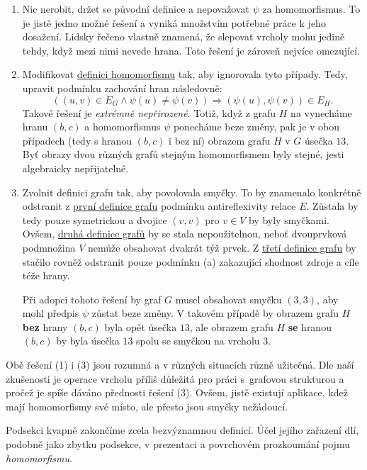 \begin{enumerate}
 \item Nic nerobit, držet se původní definice a nepovažovat $\psi$ za
  homomorfismus. To je jistě jedno možné řešení a vyniká množstvím potřebné
  práce k jeho dosažení. Lidsky řečeno vlastně znamená, že slepovat vrcholy mohu
  jedině tehdy, když mezi nimi nevede hrana. Toto řešení je zároveň nejvíce
  omezující.
 \item Modifikovat \hyperref[def:grafovy-homomorfismus]{definici homomorfismu}
  tak, aby ignorovala tyto případy. Tedy, upravit podmínku zachování hran
  následovně:
  \[
   ((u,v) \in E_G \wedge \psi(u) \neq \psi(v)) \Rightarrow (\psi(u),\psi(v)) \in
   E_H.
  \]
  Takové řešení je \emph{extrémně nepřirozené}. Totiž, když z grafu $H$ na
   vynecháme hranu $(b,c)$ a homomorfismus $\psi$
  ponecháme beze změny, pak je v obou případech (tedy s hranou $(b,c)$ i bez ní)
  obrazem grafu $H$ v $G$ úsečka $13$. Byť obrazy dvou různých grafů stejným
  homomorfismem byly stejné, jesti algebraicky nepřijatelné.
 \item Zvolnit definici grafu tak, aby povolovala smyčky. To by znamenalo
  konkrétně odstranit z \hyperref[def:graf-poprve]{první definice grafu}
  podmínku antireflexivity relace $E$. Zůstala by tedy pouze symetrickou a
  dvojice $(v,v)$ pro $v \in V$ by byly smyčkami. Ovšem,
  \hyperref[def:graf-podruhe]{druhá definice grafů} by se stala nepoužitelnou,
  neboť dvouprvková podmnožina $V$ nemůže obsahovat dvakrát týž prvek. Z
  \hyperref[def:graf-potreti]{třetí definice grafu} by stačilo rovněž odstranit
  pouze podmínku (a) zakazující shodnost zdroje a cíle téže hrany.

  Při adopci tohoto řešení by graf $G$ musel obsahovat smyčku $(3,3)$, aby mohl
  předpis $\psi$ zůstat beze změny. V takovém případě by obrazem grafu $H$
  \textbf{bez} hrany $(b,c)$ byla opět úsečka $13$, ale obrazem grafu $H$
  \textbf{se} hranou $(b,c)$ by byla úsečka $13$ spolu se smyčkou na vrcholu
  $3$.
\end{enumerate}
Obě řešení (1) i (3) jsou rozumná a v různých situacích různě užitečná. Dle naší
zkušenosti je operace  vrcholu příliš důležitá pro práci s~grafovou
strukturou a pročež je spíše dáváno přednosti řešení (3). Ovšem, jistě existují
aplikace, kdež mají homomorfismy své místo, ale přesto jsou smyčky nežádoucí.

Podsekci kvapně zakončíme zcela bezvýznamnou definicí. Účel jejího zařazení dlí,
podobně jako zbytku podsekce, v prezentaci a povrchovém prozkoumání pojmu
\emph{homomorfismu}.

